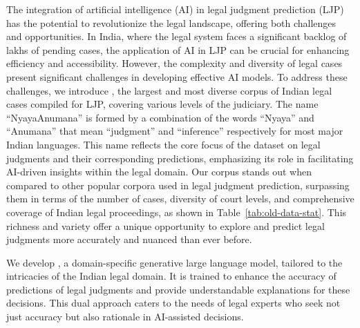 The integration of artificial intelligence (AI) in legal judgment prediction (LJP) has the potential to revolutionize the legal landscape, offering both challenges and opportunities. In India, where the legal system faces a significant backlog of lakhs of pending cases, the application of AI in LJP can be crucial for enhancing efficiency and accessibility. However, the complexity and diversity of legal cases present significant challenges in developing effective AI models. To address these challenges, we introduce \textbf{\texttt{\named}}, the largest and most diverse corpus of Indian legal cases compiled for LJP, covering various levels of the judiciary. The name ``NyayaAnumana'' is formed by a combination of the words
``Nyaya'' and ``Anumana'' that mean ``judgment''
and ``inference'' respectively for most major Indian languages. This name reflects the core focus of the dataset on legal judgments and their corresponding predictions, emphasizing its role in facilitating AI-driven insights within the legal domain. Our corpus stands out when compared to other popular corpora used in legal judgment prediction, surpassing them in terms of the number of cases, diversity of court levels, and comprehensive coverage of Indian legal proceedings, as shown in Table~\ref{tab:old-data-stat}. This richness and variety offer a unique opportunity to explore and predict legal judgments more accurately and nuanced than ever before. 

We develop \textbf{\texttt{\namel}}, a domain-specific generative large language model, tailored to the intricacies of the Indian legal domain. It is trained to enhance the accuracy of predictions of legal judgments and provide understandable explanations for these decisions. This dual approach caters to the needs of legal experts who seek not just accuracy but also rationale in AI-assisted decisions.

